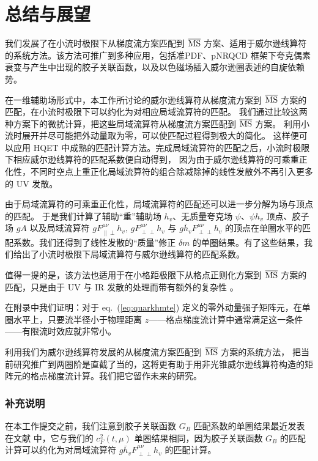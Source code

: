 \section{总结与展望}
\label{sec:summary}
我们发展了在小流时极限下从梯度流方案匹配到 $\overline{\rm MS}$ 方案、适用于威尔逊线算符的系统方法。该方法可推广到多种应用，包括准PDF、pNRQCD 框架下夸克偶素衰变与产生中出现的胶子关联函数，以及以色磁场插入威尔逊圈表述的自旋依赖势。

在一维辅助场形式中，本工作所讨论的威尔逊线算符从梯度流方案到 $\overline{\rm MS}$ 方案的匹配，在小流时极限下可以约化为对相应局域流算符的匹配。
我们通过比较这两种方案下的微扰计算，把这些局域流算符从梯度流方案匹配到 $\overline{\rm MS}$ 方案。
利用小流时展开并尽可能把外动量取为零，可以使匹配过程得到极大的简化。
这样便可以应用 HQET 中成熟的匹配计算方法。完成局域流算符的匹配之后，小流时极限下相应威尔逊线算符的匹配系数便自动得到，
因为由于威尔逊线算符的可乘重正化性，不同时空点上重正化局域流算符的组合除减除掉的线性发散外不再引入更多的 UV 发散。


由于局域流算符的可乘重正化性，局域流算符的匹配还可以进一步分解为场与顶点的匹配。
于是我们计算了辅助``重''辅助场 $h_v$、无质量夸克场 $\psi$、$\psi h_v$ 顶点、胶子场 $gA$ 以及局域流算符 $gF^{\mu\nu}_{\|\perp}h_v,\, gF^{\mu\nu}_{\perp\perp}h_v$ 与 $g\bar{h}_vF^{\mu\nu}_{\perp\perp}h_v$ 的顶点在单圈水平的匹配系数。我们还得到了线性发散的``质量''修正 $\delta m$ 的单圈结果。有了这些结果，我们给出了小流时极限下局域流算符与威尔逊线算符的匹配系数。

值得一提的是，该方法也适用于在小格距极限下从格点正则化方案到 $\overline{\rm MS}$ 方案的匹配，只是由于 UV 与 IR 发散的处理而带有额外的复杂性 \cite{Constantinou:2017sej}。



在附录中我们证明：对于 eq.~(\ref{eq:quarkhmte}) 定义的零外动量强子矩阵元，在单圈水平上，只要流半径小于物理距离 $z$——格点梯度流计算中通常满足这一条件——有限流时效应就非常小。


利用我们为威尔逊线算符发展的从梯度流方案匹配到 $\overline{\rm MS}$ 方案的系统方法，
把当前研究推广到两圈阶是直截了当的，这将更有助于用非光锥威尔逊线算符构造的矩阵元的格点梯度流计算。我们把它留作未来的研究。

\subsubsection*{补充说明}
在本工作提交之前，我们注意到胶子关联函数 $G_B$ 匹配系数的单圈结果最近发表在文献 \cite{Altenkort:2023eav} 中，它与我们的 $c_F^2(t, \mu)$ 单圈结果相同，因为胶子关联函数 $G_B$ 的匹配计算可以约化为对局域流算符 $g\bar{h}_vF^{\mu\nu}_{\perp\perp}h_v$ 的匹配计算。
